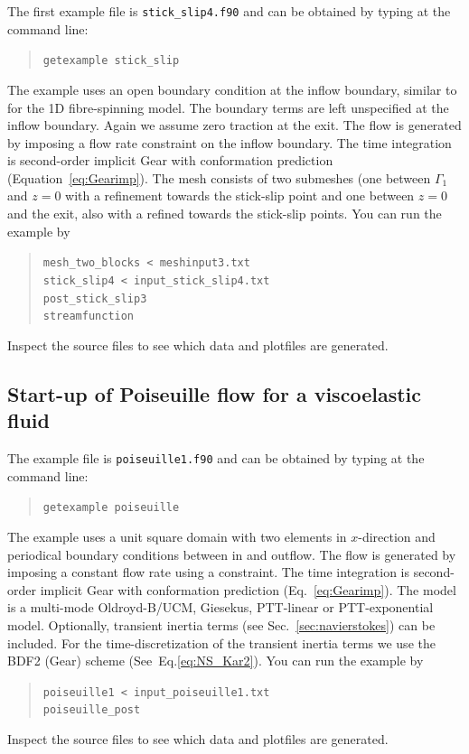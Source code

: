The first example file is \texttt{stick\_slip4.f90} and can
be obtained by typing at the
command line:
\begin{quote}
   \texttt{getexample stick\_slip}
\end{quote}
The example uses an open boundary condition at the inflow boundary,
similar to \cite{Papanastasiou96} for the 1D fibre-spinning model. The boundary terms
are left unspecified at the inflow boundary.
Again we assume zero traction at the exit.
The flow is generated by imposing a flow rate constraint on the inflow
boundary.
The time integration is second-order implicit Gear with conformation prediction
(Equation~\eqref{eq:Gearimp}).
The mesh
consists of two submeshes (one between $\Gamma_1$ and
$z=0$ with a refinement
towards the
stick-slip point and one between $z=0$
and the exit, also with a refined towards the stick-slip points.
You can run the example by
\begin{quote}
   \texttt{mesh\_two\_blocks < meshinput3.txt}\\
   \texttt{stick\_slip4 < input\_stick\_slip4.txt}\\
   \texttt{post\_stick\_slip3}\\
   \texttt{streamfunction}
\end{quote}
Inspect the source files to see which data and plotfiles are generated.

\subsection{Start-up of Poiseuille flow for a viscoelastic fluid}
\label{sec:poiseuille}

The example file is \texttt{poiseuille1.f90} and can
be obtained by typing at the
command line:
\begin{quote}
   \texttt{getexample poiseuille}
\end{quote}
The example uses a unit square domain with two elements in $x$-direction and
periodical boundary conditions between in and outflow.
The flow is generated by imposing a constant flow rate using a constraint.
The time integration is second-order implicit Gear with conformation prediction
(Eq.~\eqref{eq:Gearimp}).
The model is a multi-mode Oldroyd-B/UCM, Giesekus, PTT-linear or
PTT-exponential model.
Optionally, transient inertia terms (see Sec.~\ref{sec:navierstokes})
can be included. For the time-discretization of the transient inertia terms we
use the BDF2 (Gear) scheme (See~Eq.\eqref{eq:NS_Kar2}).
You can run the example by
\begin{quote}
   \texttt{poiseuille1 < input\_poiseuille1.txt}\\
   \texttt{poiseuille\_post}
\end{quote}
Inspect the source files to see which data and plotfiles are generated.

